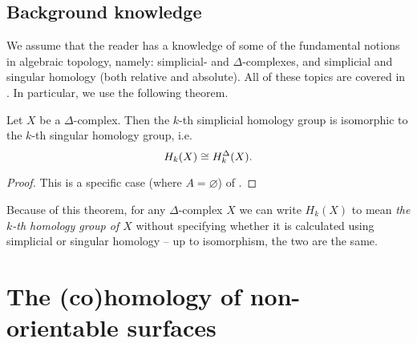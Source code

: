 \documentclass[12pt]{article}
\numberwithin{equation}{subsection}
\numberwithin{theorem}{subsection}
\numberwithin{lemma}{subsection}
\numberwithin{corollary}{subsection}
\numberwithin{definition}{subsection}
\numberwithin{example}{subsection}
\numberwithin{note}{subsection}
\begin{document}



        \subsection{Background knowledge} %
        \label{sub:assumptions}

            We assume that the reader has a knowledge of some of the fundamental notions in algebraic topology, namely: simplicial- and $\Delta$-complexes, and simplicial and singular homology (both relative and absolute).
            All of these topics are covered in \cite[\S2.1]{hatcher2002algebraic}.
            In particular, we use the following theorem.

            \begin{theorem}\label{th:simplicial-iso-singular}
                Let $X$ be a $\Delta$-complex.
                Then the $k$-th simplicial homology group is isomorphic to the $k$-th singular homology group, i.e.
                \begin{equation*}
                    H_k(X)\cong H_k^\Delta(X).\qedhere
                \end{equation*}
            \end{theorem}

            \begin{proof}
                This is a specific case (where $A=\varnothing$) of \cite[Theorem~2.27,~\S2.1]{hatcher2002algebraic}.
            \end{proof}

            Because of this theorem, for any $\Delta$-complex $X$ we can write $H_k(X)$ to mean \emph{the $k$-th homology group of $X$} without specifying whether it is calculated using simplicial or singular homology -- up to isomorphism, the two are the same.























    \section{The (co)homology of non-orientable surfaces} %
    \label{sec:the_}
\end{document}
